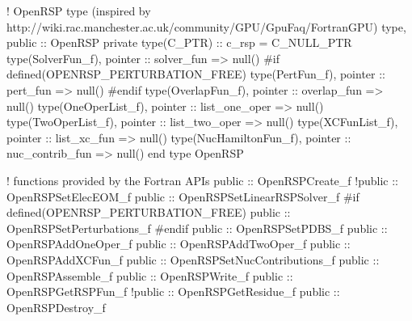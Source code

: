     ! OpenRSP type (inspired by http://wiki.rac.manchester.ac.uk/community/GPU/GpuFaq/FortranGPU)
    type, public :: OpenRSP
        private
        type(C_PTR) :: c_rsp = C_NULL_PTR
        type(SolverFun_f), pointer :: solver_fun => null()
#if defined(OPENRSP_PERTURBATION_FREE)
        type(PertFun_f), pointer :: pert_fun => null()
#endif
        type(OverlapFun_f), pointer :: overlap_fun => null()
        type(OneOperList_f), pointer :: list_one_oper => null()
        type(TwoOperList_f), pointer :: list_two_oper => null()
        type(XCFunList_f), pointer :: list_xc_fun => null()
        type(NucHamiltonFun_f), pointer :: nuc_contrib_fun => null()
    end type OpenRSP

    ! functions provided by the Fortran APIs
    public :: OpenRSPCreate_f
    !public :: OpenRSPSetElecEOM_f
    public :: OpenRSPSetLinearRSPSolver_f
#if defined(OPENRSP_PERTURBATION_FREE)
    public :: OpenRSPSetPerturbations_f
#endif
    public :: OpenRSPSetPDBS_f
    public :: OpenRSPAddOneOper_f
    public :: OpenRSPAddTwoOper_f
    public :: OpenRSPAddXCFun_f
    public :: OpenRSPSetNucContributions_f
    public :: OpenRSPAssemble_f
    public :: OpenRSPWrite_f
    public :: OpenRSPGetRSPFun_f
    !public :: OpenRSPGetResidue_f
    public :: OpenRSPDestroy_f

